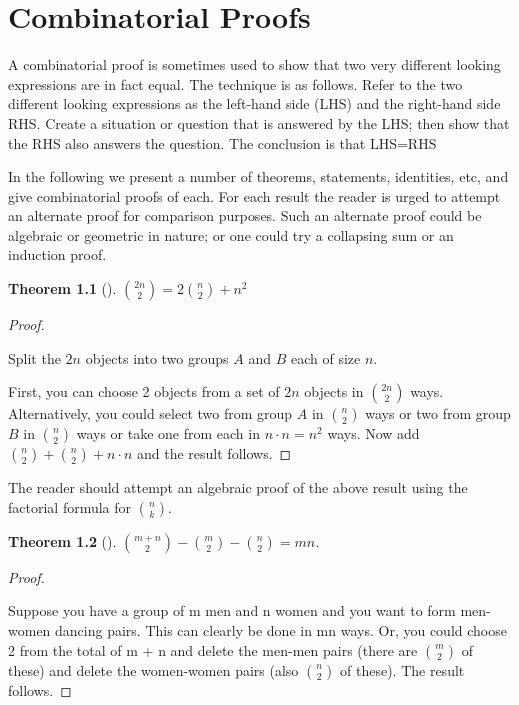 \documentclass[10pt,]{book}
\theoremstyle{plain}
\newtheorem{theorem}{Theorem}[section]
\theoremstyle{definition}
\theoremstyle{definition}
\numberwithin{equation}{chapter}
\begin{document}
\chapter[{Combinatorial Proofs}]{Combinatorial Proofs}\label{ch_temp}
\hypertarget{p-277}{}%
A combinatorial proof is sometimes used to show that two very different looking expressions are in fact equal. The technique is as follows. Refer to the two different looking expressions as the left-hand side (LHS) and the right-hand side RHS. Create a situation or question that is answered by the LHS; then show that the RHS also answers the question. The conclusion is that LHS=RHS%
\par
\hypertarget{p-278}{}%
In the following we present a number of theorems, statements, identities, etc, and give combinatorial proofs of each. For each result the reader is urged to attempt an alternate proof for comparison purposes. Such an alternate proof could be algebraic or geometric in nature; or one could try a collapsing sum or an induction proof.%
\begin{theorem}[{}]\label{theorem-6}
\hypertarget{p-279}{}%
\(\binom{2n}{2}
= 2
\binom{n}{2}
+ n^{2}\)%
\end{theorem}
\begin{proof}\hypertarget{proof-4}{}
\hypertarget{p-280}{}%
Split the \(2n\) objects into two groups \(A\) and \(B\) each of size \(n\).%
\par
\hypertarget{p-281}{}%
First, you can choose 2 objects from a set of \(2n\) objects in \(\binom{2n}{2}\) ways. Alternatively, you could select two from group \(A\) in \(\binom{n}{2}\) ways or two from group \(B\) in \(\binom{n}{2}\) ways or take one from each in \(n \cdot n = n^{2}\) ways. Now add \(\binom{n}{2} + \binom{n}{2}+ n \cdot n\) and the result follows.%
\end{proof}
\hypertarget{p-282}{}%
The reader should attempt an algebraic proof of the above result using the factorial formula for \(\binom{n}{k}\).%
\begin{theorem}[{}]\label{theorem-7}
\hypertarget{p-283}{}%
\(\binom{m + n}{2} - \binom{m}{2} - \binom{n}{2} = mn\).%
\end{theorem}
\begin{proof}\hypertarget{proof-5}{}
\hypertarget{p-284}{}%
Suppose you have a group of m men and n women and you want to form men-women dancing pairs. This can clearly be done in mn ways. Or, you could choose 2 from the total of m + n and delete the men-men pairs (there are \(\binom{m}{2}\) of these) and delete the women-women pairs (also \(\binom{n}{2}\) of these). The result follows.%
\end{proof}
\end{document}
